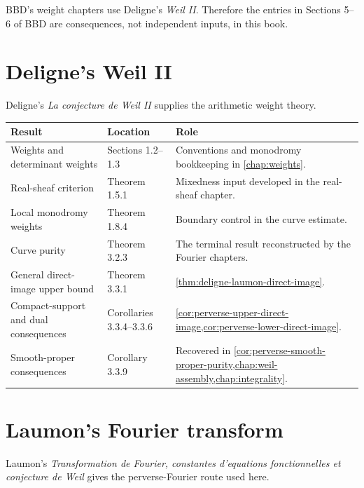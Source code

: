 BBD's weight chapters use Deligne's \emph{Weil II}.  Therefore the entries in
Sections 5--6 of BBD are consequences, not independent inputs, in this book.

\section{Deligne's Weil II}

Deligne's \emph{La conjecture de Weil II} \cite{DeligneWeilII} supplies the
arithmetic weight theory.

\begin{longtable}{
 >{\raggedright\arraybackslash}p{}
 >{\raggedright\arraybackslash}p{}
 >{\raggedright\arraybackslash}p{}}
\toprule
Result & Location & Role\\
\midrule
\endhead
Weights and determinant weights &
Sections 1.2--1.3 &
Conventions and monodromy bookkeeping in \cref{chap:weights}.\\

Real-sheaf criterion &
Theorem 1.5.1 &
Mixedness input developed in the real-sheaf chapter.\\

Local monodromy weights &
Theorem 1.8.4 &
Boundary control in the curve estimate.\\

Curve purity &
Theorem 3.2.3 &
The terminal result reconstructed by the Fourier chapters.\\

General direct-image upper bound &
Theorem 3.3.1 &
\cref{thm:deligne-laumon-direct-image}.\\

Compact-support and dual consequences &
Corollaries 3.3.4--3.3.6 &
\cref{cor:perverse-upper-direct-image,cor:perverse-lower-direct-image}.\\

Smooth-proper consequences &
Corollary 3.3.9 &
Recovered in
\cref{cor:perverse-smooth-proper-purity,chap:weil-assembly,chap:integrality}.\\
\bottomrule
\end{longtable}

\section{Laumon's Fourier transform}

Laumon's \emph{Transformation de Fourier, constantes d'equations
fonctionnelles et conjecture de Weil} \cite{LaumonFourier} gives the
perverse-Fourier route used here.

